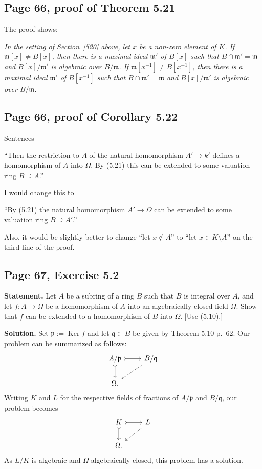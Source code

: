 \documentclass[parskip=half,fontsize=12pt]{scrartcl}%
\newcommand{\oo}{\operatorname}\newcommand{\ooo}{\operatorname*}
\newcommand{\mf}{\mathfrak}
\newcommand{\mmm}{\mf m}
\newcommand{\ppp}{\mf p}
\newcommand{\qqq}{\mf q}
\begin{document}
\subsection{Page 66, proof of Theorem 5.21}\label{521p}%

The proof shows:

\emph{In the setting of Section~\ref{520} above, let $x$ be a non-zero element of $K$. If $\mmm[x]\ne B[x]$, then there is a maximal ideal $\mmm'$ of $B[x]$ such that $B\cap\mmm'=\mmm$ %
and $B[x]/\mmm'$ is algebraic over $B/\mmm$. If $\mmm[x^{-1}]\ne B[x^{-1}]$, then there is a maximal ideal $\mmm'$ of $B[x^{-1}]$ such that $B\cap\mmm'=\mmm$ %
and $B[x]/\mmm'$ is algebraic over $B/\mmm$.}

\subsection{Page 66, proof of Corollary 5.22}%

Sentences

``Then the restriction to $A$ of the natural homomorphism $A'\to k'$ defines a homomorphism of $A$ into $\Omega$. By (5.21) this can be extended to some valuation ring $B\supseteq A$.''

I would change this to 

``By (5.21) the natural homomorphism $A'\to\Omega$ can be extended to some valuation ring $B\supseteq A'$.'' %

Also, it would be slightly better to change ``let $x\notin\overline A$'' to ``let $x\in K\setminus\overline A$'' on the third line of the proof.%

\subsection{Page 67, Exercise 5.2}\label{67}%

\textbf{Statement.} Let $A$ be a subring of a ring $B$ such that $B$ is integral over $A$, and let $f:A\to\Omega$ be a homomorphism of $A$ into an algebraically closed field $\Omega$. Show that $f$ can be extended to a homomorphism of $B$ into $\Omega$. [Use (5.10).]

\textbf{Solution.} Set $\ppp:=\oo{Ker}f$ and let $\qqq\subset B$ be given by Theorem 5.10 p.~62. Our problem can be summarized as follows: 
$$
\begin{tikzcd}
A/\ppp\ar[r,tail]\ar[d,tail]&B/\qqq\ar[dl,dashrightarrow]\\ 
\Omega.
\end{tikzcd}
$$ 
Writing $K$ and $L$ for the respective fields of fractions of $A/\ppp$ and $B/\qqq$, our problem becomes  
$$
\begin{tikzcd}
K\ar[r,tail]\ar[d,tail]&L\ar[dl,dashrightarrow]\\ 
\Omega.
\end{tikzcd}
$$ 
As $L/K$ is algebraic and $\Omega$ algebraically closed, this problem has a solution.
\end{document}
